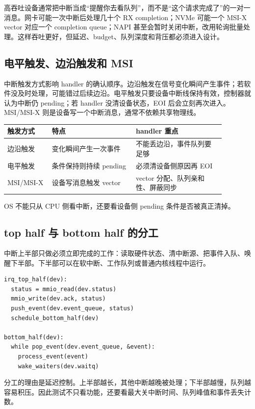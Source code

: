高吞吐设备通常把中断当成“提醒你去看队列”，而不是“这个请求完成了”的一对一消息。网卡可能一次中断后处理几十个 RX completion；NVMe 可能一个 MSI-X vector 对应一个 completion queue；NAPI 甚至会暂时关闭中断，改用轮询批量处理。这样吞吐更好，但延迟、budget、队列深度和背压都必须进入设计。

\subsection{电平触发、边沿触发和 MSI}

中断触发方式影响 handler 的确认顺序。边沿触发在信号变化瞬间产生事件；若软件没及时处理，可能错过后续边沿。电平触发只要设备中断线保持有效，控制器就认为中断仍 pending；若 handler 没清设备状态，EOI 后会立刻再次进入。MSI/MSI-X 则是设备写一个中断消息，通常不依赖共享物理线。

\begin{longtable}{p{0.18\linewidth}p{0.34\linewidth}p{0.36\linewidth}}
\toprule
触发方式 & 特点 & handler 重点 \\
\midrule
边沿触发 & 变化瞬间产生一次事件 & 不能丢边沿，事件队列要足够 \\
电平触发 & 条件保持则持续 pending & 必须清设备侧原因再 EOI \\
MSI/MSI-X & 设备写消息触发 vector & vector 分配、队列亲和性、屏蔽同步 \\
\bottomrule
\end{longtable}

OS 不能只从 CPU 侧看中断，还要看设备侧 pending 条件是否被真正清掉。

\subsection{top half 与 bottom half 的分工}

中断上半部只做必须立即完成的工作：读取硬件状态、清中断源、把事件入队、唤醒下半部。下半部可以在软中断、工作队列或普通内核线程中运行。

\begin{lstlisting}
irq_top_half(dev):
  status = mmio_read(dev.status)
  mmio_write(dev.ack, status)
  push_event(dev.event_queue, status)
  schedule_bottom_half(dev)

bottom_half(dev):
  while pop_event(dev.event_queue, &event):
    process_event(event)
    wake_waiters(dev.waitq)
\end{lstlisting}

分工的理由是延迟控制。上半部越长，其他中断越晚被处理；下半部越慢，队列越容易积压。因此测试不只看功能，还要看最大关中断时间、队列峰值和事件丢失计数。

